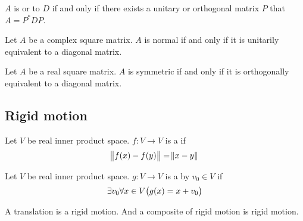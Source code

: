 \begin{definition}
    $A$ is  or  to $D$ if and only if there exists a unitary or orthogonal matrix $P$ that $A = P^* D P$.
\end{definition}

\begin{theorem}
    Let $A$ be a complex square matrix. $A$ is normal if and only if it is unitarily equivalent to a diagonal matrix.    
\end{theorem}

\begin{theorem}
    Let $A$ be a real square matrix. $A$ is symmetric if and only if it is orthogonally equivalent to a diagonal matrix.    
\end{theorem}






\subsection{Rigid motion}

\begin{definition}
    Let $V$ be real inner product space. $f: V \rightarrow V$ is a  if 
    \begin{equation}
        \norm{f(x) - f(y)} = \norm{x - y}
    \end{equation}
\end{definition}

\begin{definition}
    Let $V$ be real inner product space. $g: V \rightarrow V$ is a  by $v_0 \in V$ if
    \begin{equation}
        \exists v_0 \forall x \in V \mleft( g(x) = x + v_0 \mright)
    \end{equation}
\end{definition}

\begin{theorem}
    A translation is a rigid motion. And a composite of rigid motion is rigid motion.    
\end{theorem}


